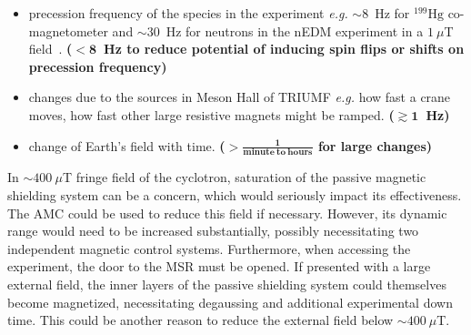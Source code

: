 \begin{itemize}
    \item  precession frequency of the species in the experiment {\it e.g.} $\sim8$~Hz for $\mathrm{^{199}Hg}$ co-magnetometer and $\sim30$~Hz for neutrons in the nEDM experiment in a $1~\mu$T field~\cite{bea_paper}. {\bf ($\mathbf{<8}$~Hz to reduce potential of inducing spin flips or shifts on precession frequency)}
    \item  changes due to the sources in Meson Hall of TRIUMF {\it e.g.} how fast a crane moves, how fast other large resistive magnets might be ramped. {\bf ($\mathbf{\gtrsim1}$~Hz)}
    \item  change of Earth's field with time. {\bf ($\mathbf{>\frac{1}{\mathrm{\mathbf{minute~to~hours}}}}$ for large changes)}
\end{itemize}






In $\sim400~\mu$T fringe field of the cyclotron, saturation of the passive magnetic shielding system can be a concern, which would seriously impact its effectiveness. The AMC could be used to reduce this field if necessary. However, its dynamic range would need to be increased substantially, possibly necessitating two independent magnetic control systems. Furthermore, when accessing the experiment, the door to the MSR must be opened. If presented with a large external field, the inner layers of the passive shielding system could themselves become magnetized, necessitating degaussing and additional experimental down time. This could be another reason to reduce the external field below $\sim400~\mu$T.




